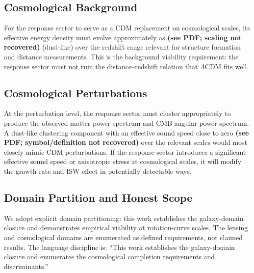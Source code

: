 \subsection{Cosmological Background}

For the response sector to serve as a CDM replacement on cosmological scales, its effective energy density must evolve approximately as \textbf{(see PDF; scaling not recovered)} (dust-like) over the redshift range relevant for structure formation and distance measurements. This is the background viability requirement: the response sector must not ruin the distance--redshift relation that $\Lambda$CDM fits well.

\subsection{Cosmological Perturbations}

At the perturbation level, the response sector must cluster appropriately to produce the observed matter power spectrum and CMB angular power spectrum. A dust-like clustering component with an effective sound speed close to zero \textbf{(see PDF; symbol/definition not recovered)} over the relevant scales would most closely mimic CDM perturbations. If the response sector introduces a significant effective sound speed or anisotropic stress at cosmological scales, it will modify the growth rate and ISW effect in potentially detectable ways.

\subsection{Domain Partition and Honest Scope}

We adopt explicit domain partitioning: this work establishes the galaxy-domain closure and demonstrates empirical viability at rotation-curve scales. The lensing and cosmological domains are enumerated as defined requirements, not claimed results. The language discipline is: ``This work establishes the galaxy-domain closure and enumerates the cosmological completion requirements and discriminants.''
